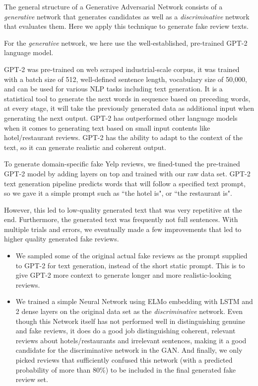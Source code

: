 \documentclass[conference, 11pt]{IEEEtran} %
\theoremstyle{plain}
\theoremstyle{definition}
\begin{document}
The general structure of a Generative Adversarial Network consists of a \textit{generative} network that generates candidates as well as a \textit{discriminative} network that evaluates them. Here we apply this technique to generate fake review texts.

For the \textit{generative} network, we here use the well-established, pre-trained GPT-2 language model.

GPT-2 was pre-trained on web scraped industrial-scale corpus, it was trained with a batch size of 512, well-defined sentence length, vocabulary size of 50,000, and can be used for various NLP tasks including text generation. It is a statistical tool to generate the next words in sequence based on preceding words, at every stage, it will take the previously generated data as additional input when generating the next output. GPT-2 has outperformed other language models when it comes to generating text based on small input contents like hotel/restaurant reviews. GPT-2 has the ability to adapt to the context of the text, so it can generate realistic and coherent output. 

To generate domain-specific fake Yelp reviews, we fined-tuned the pre-trained GPT-2 model by adding layers on top and trained with our raw data set. GPT-2 text generation pipeline predicts words that will follow a specified text prompt, so we gave it a simple prompt such as ``the hotel is", or ``the restaurant is".

However, this led to low-quality generated text that was very repetitive at the end. Furthermore, the generated text was frequently not full sentences. With multiple trials and errors, we eventually made a few improvements that led to higher quality generated fake reviews.
\begin{itemize}
\item We sampled some of the original actual fake reviews as the prompt supplied to GPT-2 for text generation, instead of the short static prompt. This is to give GPT-2 more context to generate longer and more realistic-looking reviews.

\item We trained a simple Neural Network using ELMo embedding with LSTM and 2 dense layers on the original data set as the \textit{discriminative} network. Even though this Network itself has not performed well in distinguishing genuine and fake reviews, it does do a good job distinguishing coherent, relevant reviews about hotels/restaurants and irrelevant sentences, making it a good candidate for the discriminative network in the GAN. And finally, we only picked reviews that sufficiently confused this network (with a predicted probability of more than 80\%) to be included in the final generated fake review set.
\end{itemize}
\end{document}
